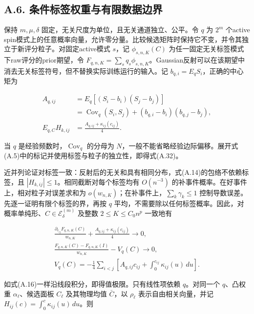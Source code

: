 \documentclass[11pt,a4paper]{article}
\begin{document}
\subsection*{A.6.
条件标签权重与有限数据边界}\label{a.6.-ux6761ux4ef6ux6807ux7b7eux6743ux91cdux4e0eux6709ux9650ux6570ux636eux8fb9ux754c}

保持 \(m,\mu,\delta\) 固定，无关尺度为单位，且无关通道独立、公平。令
\(q\) 为 \(2^m\) 个active
spin模式上的任意概率向量，允许零分量。比较候选矩阵时保持它不变，并令其独立于新评分粒子。对固定active模式
\(s\)，记 \(\phi_{s,n,K}(C)\)
为任一固定无关标签模式下raw评分的prior期望，令
\(F_{q,n,K}=\sum_s q_s\phi_{s,n,K}\)。Gaussian反射可以在该期望中消去无关标签符号，但不替换实际训练运行的输入。记
\(b_{q,i}=E_qS_i\)，正确的中心矩为

\[
\begin{aligned}
A_{q,ij}&=E_q[(S_i-b_i)(S_j-b_j)]\\
&=\operatorname{Cov}_q(S_i,S_j)+(b_{q,i}-b_i)(b_{q,j}-b_j),\\
E_{q,C}H_{k,ij}&=\frac{A_{q,ij}+\kappa_{ij}(c_{ij})}{4}.
\end{aligned}
\tag{A.32}
\]

当 \(q\) 是经验频数时，\(\operatorname{Cov}_q\) 的分母为
\(N\)，一般不能省略经验边际偏移。展开式(A.5)中的标记并使用标签与粒子的独立性，即得式(A.32)。

近并列论证对标签一致：反射后的无关和具有相同分布，式(A.14)的包络不依赖标签，且
\(|H_{k,ij}|\le1\)。相同截断对每个标签均有 \(O(n^{-3})\)
的补事件概率。在好事件上，相对粒子对误差求和为
\(o(w_{n,K})\)；在补事件上，\(\sum_k\gamma_k\le1\)
控制导数误差。先逐一证明有限个标签的界，再按 \(q\)
平均，不需要除以任何标签概率。因此，对概率单纯形、\(C\in\mathcal E_\delta^{(m)}\)
及整数 \(2\le K\le C_0n^p\) 一致地有

\[
\begin{gathered}
\frac{\partial_{c_{ij}}F_{q,n,K}(C)}{w_{n,K}}
+\frac{A_{q,ij}+\kappa_{ij}(c_{ij})}{4}\longrightarrow0,\\
\frac{F_{q,n,K}(C)-F_{q,n,K}(I)}{w_{n,K}}-V_q(C)\longrightarrow0,\\
V_q(C)=-\frac14\sum_{i<j}
\left[A_{q,ij}c_{ij}+\int_0^{c_{ij}}\kappa_{ij}(u)\,du\right].
\end{gathered}
\tag{A.33}
\]

如式(A.16)一样沿线段积分，即得值极限。只有线性项依赖 \(q\)。对同一个
\(q\)、凸权重 \(\alpha_\ell\)、候选面板 \(C_\ell\) 及其物理均值
\(\bar C\)，以 \(\rho_\ell\) 表示自由相关向量，并记
\(H_{ij}(c)=\int_0^c\kappa_{ij}(u)\,du\)。则
\end{document}
